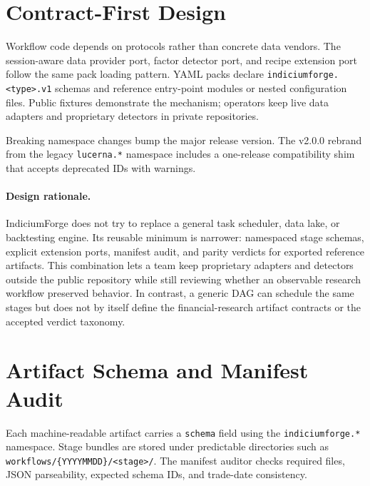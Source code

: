 \documentclass[11pt]{article}
\newcommand{\schema}[1]{\texttt{#1}}
\begin{document}
\section{Contract-First Design}

Workflow code depends on protocols rather than concrete data vendors. The session-aware
data provider port, factor detector port, and recipe extension port follow the same pack
loading pattern. YAML packs declare \schema{indiciumforge.<type>.v1} schemas and reference
entry-point modules or nested configuration files. Public fixtures demonstrate the mechanism;
operators keep live data adapters and proprietary detectors in private repositories.

Breaking namespace changes bump the major release version. The v2.0.0 rebrand from the
legacy \schema{lucerna.*} namespace includes a one-release compatibility shim that accepts
deprecated IDs with warnings.

\paragraph{Design rationale.}
IndiciumForge does not try to replace a general task scheduler, data lake, or backtesting
engine. Its reusable minimum is narrower: namespaced stage schemas, explicit extension
ports, manifest audit, and parity verdicts for exported reference artifacts. This combination
lets a team keep proprietary adapters and detectors outside the public repository while still
reviewing whether an observable research workflow preserved behavior. In contrast, a generic
DAG can schedule the same stages but does not by itself define the financial-research artifact
contracts or the accepted verdict taxonomy.

\section{Artifact Schema and Manifest Audit}

Each machine-readable artifact carries a \texttt{schema} field using the
\schema{indiciumforge.*} namespace. Stage bundles are stored under predictable directories
such as \texttt{workflows/\{YYYYMMDD\}/<stage>/}. The manifest auditor checks required files,
JSON parseability, expected schema IDs, and trade-date consistency.
\end{document}
